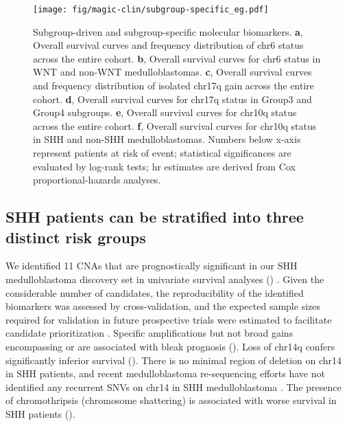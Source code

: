 \clearpage

\begin{figure}[h]
	\begin{center}
		\texttt{[image: fig/magic-clin/subgroup-specific\_eg.pdf]}
	\end{center}
	\caption[Subgroup-driven and subgroup-specific molecular biomarkers]
	{
	Subgroup-driven and subgroup-specific molecular biomarkers.
	\textbf{a}, Overall survival curves and frequency distribution of chr6 status across the entire cohort.
	\textbf{b}, Overall survival curves for chr6 status in WNT and non-WNT medulloblastomas.		
	\textbf{c}, Overall survival curves and frequency distribution of isolated chr17q gain across the entire cohort.
	\textbf{d}, Overall survival curves for chr17q status in Group3 and Group4 subgroups. 
	\textbf{e}, Overall survival curves for chr10q status across the entire cohort.
	\textbf{f}, Overall survival curves for chr10q status in SHH and non-SHH medulloblastomas.
	Numbers below x-axis represent patients at risk of event; statistical significances are evaluated by log-rank tests; \gls{hr} estimates are derived from Cox proportional-hazards analyses.
	}
	\label{fig:subgroup-specific_eg}
\end{figure}

\clearpage

\subsection{SHH patients can be stratified into three distinct risk groups}

We identified 11 CNAs that are prognostically significant in our SHH medulloblastoma discovery set in univariate survival analyses () . Given the considerable number of candidates, the reproducibility of the identified biomarkers was assessed by cross-validation, and the expected sample sizes required for validation in future prospective trials were estimated to facilitate candidate prioritization . Specific amplifications but not broad gains encompassing  or  are associated with bleak prognosis (). Loss of chr14q confers significantly inferior survival (). There is no minimal region of deletion on chr14 in SHH patients, and recent medulloblastoma re-sequencing efforts have not identified any recurrent SNVs on chr14 in SHH medulloblastoma . The presence of chromothripsis (chromosome shattering) is associated with worse survival in SHH patients ().

